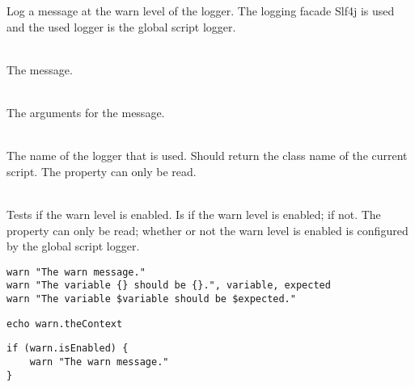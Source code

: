 %


Log a message at the warn level of the logger.
The logging facade Slf4j\cite{slf4j13} is used and the used logger is
the global script logger.

\begin{asparadesc}
%
\item[\code{message}] \hfill \\
The message.
%
\item[\code{args}] \hfill \\
The arguments for the message.
%
\item[\code{theContext}] \hfill \\
The name of the logger that is used. Should return the class name of the current
script. The property can only be read.
%
\item[\code{isEnabled}] \hfill \\
Tests if the warn level is enabled. Is  if the warn level is enabled;
 if not. The property can only be read; whether or not the warn
level is enabled is configured by the global script logger.
%
\end{asparadesc}

\begin{lstlisting}[style=Groovybash, label={lst:example_warn1}, title={%
Outputs a warn logging message with arguments.}]
warn "The warn message."
warn "The variable {} should be {}.", variable, expected
warn "The variable $variable should be $expected."
\end{lstlisting}

\begin{lstlisting}[style=Groovybash, label={lst:example_warn2}, title={%
Prints the name of the current logger.}]
echo warn.theContext
\end{lstlisting}

\begin{lstlisting}[style=Groovybash, label={lst:example_warn3}, title={%
Tests if the warn level is enabled.}]
if (warn.isEnabled) {
    warn "The warn message."
}
\end{lstlisting}

